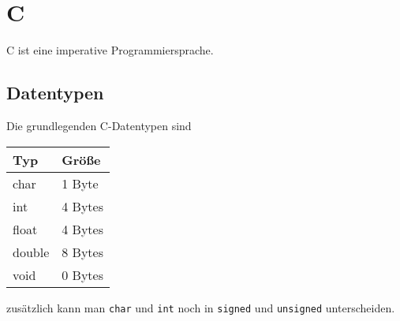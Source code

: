 \chapter{C}
C ist eine imperative Programmiersprache.

\section{Datentypen}
Die grundlegenden C-Datentypen sind
\begin{table}[htp]
    \centering
    \begin{tabular}{|l|l|}
    \hline
    \textbf{Typ}    & \textbf{Größe}   \\ \hline\hline
    char   & 1 Byte  \\ \hline
    int    & 4 Bytes \\ \hline
    float  & 4 Bytes \\ \hline
    double & 8 Bytes \\ \hline
    void   & 0 Bytes \\ \hline
    \end{tabular}
\end{table}

zusätzlich kann man \texttt{char} und \texttt{int}
noch in \texttt{signed} und \texttt{unsigned}
unterscheiden.

